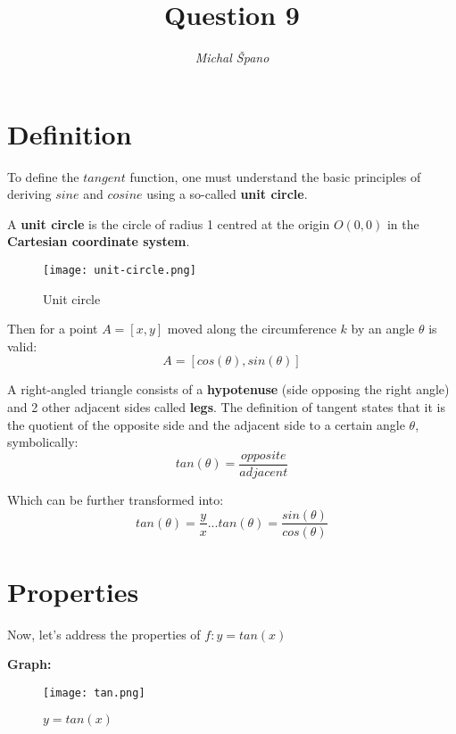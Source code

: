 \documentclass{article}
\title{\textbf{Question 9}}
\author{\textit{Michal Špano}}
\date{}
\begin{document}
\maketitle

\section{Definition}
To define the $tangent$ function, one must understand the basic principles of deriving $sine$ and $cosine$ using a so-called \textbf{unit circle}.

A \textbf{unit circle} is the circle of radius 1 centred at the origin $O(0, 0)$ in the \textbf{Cartesian coordinate system}.

\begin{figure}[htp]
    \centering
    \texttt{[image: unit-circle.png]}
    \caption{Unit circle}
\end{figure}

Then for a point $A = [x, y]$ moved along the circumference $k$ by an angle $\theta$ is valid:\\ 
\[  
A = \left[ cos(\theta), sin(\theta) \right]
\]

A right-angled triangle consists of a \textbf{hypotenuse} (side opposing the right angle) and 2 other adjacent sides called \textbf{legs}. The definition of tangent states that it is the quotient of the opposite side and the adjacent side to a certain angle $\theta$, symbolically: 
\[
tan(\theta) = \frac{opposite}{adjacent}
\]

Which can be further transformed into: 
\[
tan(\theta) = \frac{y}{x} ... tan(\theta) = \frac{sin(\theta)}{cos(\theta)}
\]

\section{Properties}

Now, let's address the properties of $f:y=tan(x)$

\textbf{Graph: }

\begin{figure}[htp]
    \centering
    \texttt{[image: tan.png]}
    \caption{$y=tan(x)$}
\end{figure}
\end{document}
